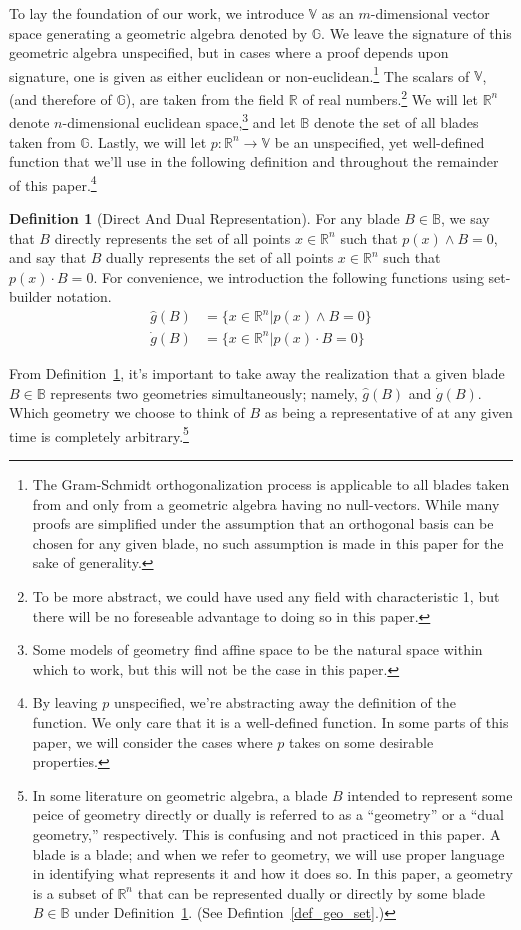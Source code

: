 \documentclass{birkjour}
\theoremstyle{definition}
\newtheorem{defn}[thm]{Definition}
\theoremstyle{remark}
\numberwithin{equation}{section}
\newcommand{\R}{\mathbb{R}}
\newcommand{\B}{\mathbb{B}}
\newcommand{\G}{\mathbb{G}}
\newcommand{\V}{\mathbb{V}}
\newcommand{\gd}{\dot{g}}
\newcommand{\gh}{\hat{g}}
\begin{document}
To lay the foundation of our work, we introduce $\V$ as an $m$-dimensional vector
space generating a geometric algebra denoted by $\G$.  We leave the signature of this geometric algebra
unspecified, but in cases where a proof depends upon signature, one is given as either
euclidean or non-euclidean.\footnote{The Gram-Schmidt orthogonalization process is applicable
to all blades taken from and only from a geometric algebra having no null-vectors.  While many proofs
are simplified under the assumption that an orthogonal basis can be chosen for any given blade, no such
assumption is made in this paper for the sake of generality.}
The scalars of $\V$, (and therefore of $\G$), are taken from the field $\R$ of real numbers.\footnote{To be more abstract,
we could have used any field with characteristic 1, but there will be no foreseable advantage to doing so in this paper.}
We will let $\R^n$ denote $n$-dimensional euclidean space,\footnote{Some models of geometry find affine space to be the natural
space within which to work, but this will not be the case in this paper.} and let $\B$ denote the set of all blades taken from $\G$.
Lastly, we will let $p:\R^n\to\V$ be an unspecified, yet well-defined function that we'll use in the following definition and
throughout the remainder of this paper.\footnote{By leaving $p$ unspecified, we're abstracting away the definition of the function.
We only care that it is a well-defined function.  In some parts of this paper, we will consider the cases where $p$ takes on some desirable
properties.}

\begin{defn}[Direct And Dual Representation]\label{def_blade_rep_geo}
For any blade $B\in\B$, we say that $B$ directly represents the set of all points $x\in\R^n$ such that
$p(x)\wedge B=0$, and say that $B$ dually represents the set of all points $x\in\R^n$ such that
$p(x)\cdot B=0$.  For convenience, we introduction the following functions using set-builder notation.
\begin{align*}
\gh(B) &= \{x\in\R^n|p(x)\wedge B=0\} \\
\gd(B) &= \{x\in\R^n|p(x)\cdot B=0\}
\end{align*}
\end{defn}
From Definition~\ref{def_blade_rep_geo}, it's important to take away the realization that a given blade $B\in\B$ represents two geometries
simultaneously; namely, $\gh(B)$ and $\gd(B)$.  Which geometry we choose to think of $B$ as being a representative of at any given time is completely
arbitrary.\footnote{In some literature on geometric algebra, a blade $B$ intended to represent some peice of geometry directly or dually
is referred to as a ``geometry'' or a ``dual geometry,'' respectively.  This is confusing and not practiced in this paper.  A blade is a blade; and when
we refer to geometry, we will use proper language in identifying what represents it and how it does so.  In this paper, a geometry is a subset of
$\R^n$ that can be represented dually or directly by some blade $B\in\B$ under Definition~\ref{def_blade_rep_geo}.  (See Defintion~\ref{def_geo_set}.)}
\end{document}
